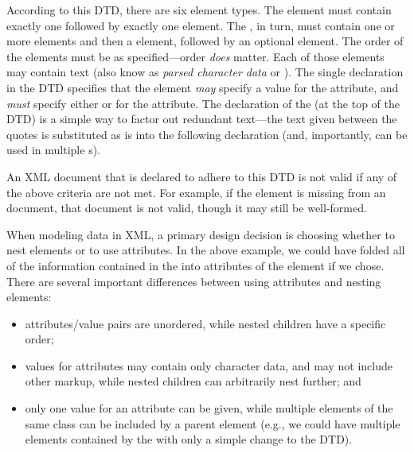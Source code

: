 \documentclass{article}
\begin{document}
\begin{multicols}{2}
According to this DTD, there are six element types. The 
element must contain exactly one  followed by exactly one
 element.  The , in turn, must contain one
or more  elements and then a  element,
followed by an optional  element.  The order of the
elements must be as specified---order \emph{does} matter. Each of those
elements may contain text (also know as \emph{parsed character data} or
).  The single  declaration in the
DTD specifies that the  element \emph{may} specify a
value for the  attribute, and \emph{must} specify
either  or  for the 
attribute. The  declaration of the
 (at the top of the DTD) is a simple way to
factor out redundant text---the text given between the quotes is
substituted as is into the following  declaration
(and, importantly, can be used in multiple s).

An XML document that is declared to adhere to this DTD is not valid if
any of the above criteria are not met.  For example, if the
 element is missing from an  document, that
document is not valid, though it may still be well-formed.

When modeling data in XML, a primary design decision is choosing whether
to nest elements or to use attributes.  In the above example, we could
have folded all of the information contained in the  into
attributes of the  element if we chose.  There are
several important differences between using attributes and nesting
elements:

\begin{itemize}

\item attributes/value pairs are unordered, while nested children have a
specific order;

\item values for attributes may contain only character data, and may not
      include other markup, while nested children can arbitrarily nest
      further; and
      
\item only one value for an attribute can be given, while multiple
      elements of the same class can be included by a parent element
      (e.g., we could have multiple  elements contained by
      the  with only a simple change to the DTD).


\end{itemize}
\end{multicols}
\end{document}
